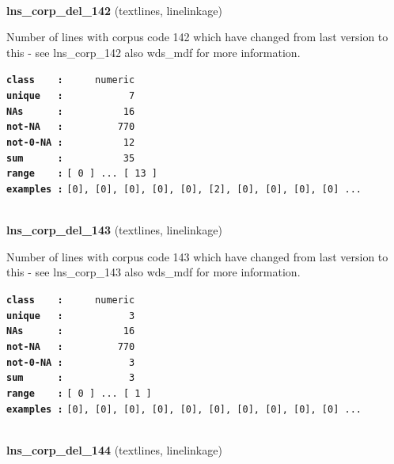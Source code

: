 \documentclass[]{article}
\begin{document}
~

\textbf{lns\_corp\_del\_142} (textlines, linelinkage)

Number of lines with corpus code 142 which have changed from last
version to this - see lns\_corp\_142 also wds\_mdf for more information.

\textbf{\texttt{class\ \ \ \ :}} \texttt{~~~~~numeric}\\
\textbf{\texttt{unique\ \ \ :}} \texttt{~~~~~~~~~~~7}\\
\textbf{\texttt{NAs\ \ \ \ \ \ :}} \texttt{~~~~~~~~~~16}\\
\textbf{\texttt{not-NA\ \ \ :}} \texttt{~~~~~~~~~770}\\
\textbf{\texttt{not-0-NA\ :}} \texttt{~~~~~~~~~~12}\\
\textbf{\texttt{sum\ \ \ \ \ \ :}} \texttt{~~~~~~~~~~35}\\
\textbf{\texttt{range\ \ \ \ :}}
\texttt{{[}\ 0\ {]}\ ...\ {[}\ 13\ {]}}\\
\textbf{\texttt{examples\ :}}
\texttt{{[}0{]},\ {[}0{]},\ {[}0{]},\ {[}0{]},\ {[}0{]},\ {[}2{]},\ {[}0{]},\ {[}0{]},\ {[}0{]},\ {[}0{]}\ ...}\\

~

\textbf{lns\_corp\_del\_143} (textlines, linelinkage)

Number of lines with corpus code 143 which have changed from last
version to this - see lns\_corp\_143 also wds\_mdf for more information.

\textbf{\texttt{class\ \ \ \ :}} \texttt{~~~~~numeric}\\
\textbf{\texttt{unique\ \ \ :}} \texttt{~~~~~~~~~~~3}\\
\textbf{\texttt{NAs\ \ \ \ \ \ :}} \texttt{~~~~~~~~~~16}\\
\textbf{\texttt{not-NA\ \ \ :}} \texttt{~~~~~~~~~770}\\
\textbf{\texttt{not-0-NA\ :}} \texttt{~~~~~~~~~~~3}\\
\textbf{\texttt{sum\ \ \ \ \ \ :}} \texttt{~~~~~~~~~~~3}\\
\textbf{\texttt{range\ \ \ \ :}}
\texttt{{[}\ 0\ {]}\ ...\ {[}\ 1\ {]}}\\
\textbf{\texttt{examples\ :}}
\texttt{{[}0{]},\ {[}0{]},\ {[}0{]},\ {[}0{]},\ {[}0{]},\ {[}0{]},\ {[}0{]},\ {[}0{]},\ {[}0{]},\ {[}0{]}\ ...}\\

~

\textbf{lns\_corp\_del\_144} (textlines, linelinkage)
\end{document}
